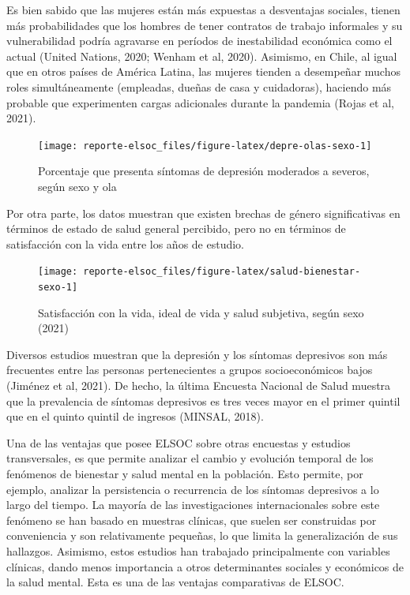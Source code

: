 \documentclass[
  12pt,
]{book}
\begin{document}
Es bien sabido que las mujeres están más expuestas a desventajas sociales, tienen más probabilidades que los hombres de tener contratos de trabajo informales y su vulnerabilidad podría agravarse en períodos de inestabilidad económica como el actual (United Nations, 2020; Wenham et al, 2020). Asimismo, en Chile, al igual que en otros países de América Latina, las mujeres tienden a desempeñar muchos roles simultáneamente (empleadas, dueñas de casa y cuidadoras), haciendo más probable que experimenten cargas adicionales durante la pandemia (Rojas et al, 2021).

\begin{figure}

{\centering \texttt{[image: reporte-elsoc\_files/figure-latex/depre-olas-sexo-1]} 

}

\caption{Porcentaje que presenta síntomas de depresión moderados a severos, según sexo y ola}\label{fig:depre-olas-sexo}
\end{figure}

Por otra parte, los datos muestran que existen brechas de género significativas en términos de estado de salud general percibido, pero no en términos de satisfacción con la vida entre los años de estudio.

\begin{figure}

{\centering \texttt{[image: reporte-elsoc\_files/figure-latex/salud-bienestar-sexo-1]} 

}

\caption{Satisfacción con la vida, ideal de vida y salud subjetiva, según sexo (2021)}\label{fig:salud-bienestar-sexo}
\end{figure}

Diversos estudios muestran que la depresión y los síntomas depresivos son más frecuentes entre las personas pertenecientes a grupos socioeconómicos bajos (Jiménez et al, 2021). De hecho, la última Encuesta Nacional de Salud muestra que la prevalencia de síntomas depresivos es tres veces mayor en el primer quintil que en el quinto quintil de ingresos (MINSAL, 2018).

Una de las ventajas que posee ELSOC sobre otras encuestas y estudios transversales, es que permite analizar el cambio y evolución temporal de los fenómenos de bienestar y salud mental en la población. Esto permite, por ejemplo, analizar la persistencia o recurrencia de los síntomas depresivos a lo largo del tiempo. La mayoría de las investigaciones internacionales sobre este fenómeno se han basado en muestras clínicas, que suelen ser construidas por conveniencia y son relativamente pequeñas, lo que limita la generalización de sus hallazgos. Asimismo, estos estudios han trabajado principalmente con variables clínicas, dando menos importancia a otros determinantes sociales y económicos de la salud mental. Esta es una de las ventajas comparativas de ELSOC.
\end{document}
